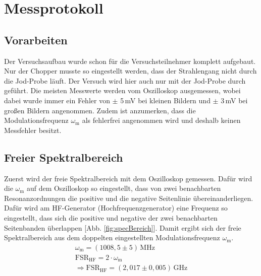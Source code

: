 
\def\skalierung{0.65}

\chapter{Messprotokoll}
\label{chap:protokoll}

\section{Vorarbeiten}
\label{sec:vorarbeit}

Der Versuchsaufbau wurde schon für die Versuchsteilnehmer komplett aufgebaut. Nur der Chopper musste so eingestellt werden, dass der Strahlengang nicht durch die Jod-Probe läuft. Der Versuch wird hier auch nur mit der Jod-Probe durch geführt. Die meisten Messwerte werden vom Oszilloskop ausgemessen, wobei dabei wurde immer ein Fehler von $\pm$ 5\,mV bei kleinen Bildern und $\pm$ 3\,mV bei großen Bildern angenommen. Zudem ist anzumerken, dass die Modulationsfrequenz $\omega_\mathrm{m}$ als fehlerfrei angenommen wird und deshalb keinen Messfehler besitzt.

\section{Freier Spektralbereich}
\label{sec:specBereich}

Zuerst wird der freie Spektralbereich mit dem Oszilloskop gemessen. Dafür wird die $\omega_\mathrm{m}$ auf dem Oszilloskop so eingestellt, dass von zwei benachbarten Resonanzordnungen die positive und die negative Seitenlinie übereinanderliegen. Dafür wird am HF-Generator (Hochfrequenzgenerator) eine Frequenz so eingestellt, dass sich die positive und negative der zwei benachbarten Seitenbanden überlappen [Abb. \ref{fig:specBereich}]. Damit ergibt sich der freie Spektralbereich aus dem doppelten eingestellten Modulationsfrequenz $\omega_\mathrm{m}$. 
\begin{gather}
    \omega_\mathrm{m} = ( 1008,5 \pm 5 )\,\mathrm{MHz} \\
    \mathrm{FSR}_\mathrm{HF} = 2 \cdot \omega_\mathrm{m} \\
    \Rightarrow \boxed{\mathrm{FSR}_\mathrm{HF} = ( 2,017 \pm 0,005 )\,\mathrm{GHz}}
\end{gather}


